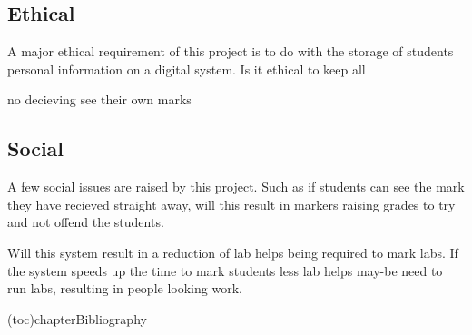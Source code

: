 \documentclass[12pt]{article}  %
\theoremstyle{definition}
\theoremstyle{remark}
\begin{document}
\subsection{Ethical}

A major ethical requirement of this project is to do with the storage of students personal information on a digital system. Is it ethical to keep all 

no decieving see their own marks

\subsection{Social}

A few social issues are raised by this project. Such as if students can see the mark they have recieved straight away, will this result in markers raising grades to try and not offend the students.

Will this system result in a reduction of lab helps being required to mark labs. If the system speeds up the time to mark students less lab helps may-be need to run labs, resulting in people looking work.



%
%

\newpage


\addcontentsline(toc){chapter}{Bibliography}

\end{document}
